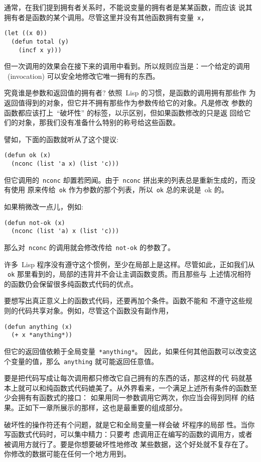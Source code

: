通常，在我们提到拥有者关系时，不能说变量的拥有者是某某函数，而应该
说其拥有者是函数的某个调用。尽管这里并没有其他函数拥有变量~\verb|x|，
\begin{lstlisting}
(let ((x 0))
  (defun total (y)
    (incf x y)))
\end{lstlisting}
但一次调用的效果会在接下来的调用中看到。所以规则应当是：一个给定的调用
~(invocation) 可以安全地修改它唯一拥有的东西。

究竟谁是参数和返回值的拥有者? 依照~Lisp 的习惯，是函数的调用拥有那些作
为返回值得到的对象，但它并不拥有那些作为参数传给它的对象。凡是修改
参数的函数都应该打上~``破坏性'' 的标签，以示区别，但如果函数修改的只是返
回给它们的对象，那我们没有准备什么特别的称号给这些函数。

譬如，下面的函数就听从了这个提议:
\begin{lstlisting}
(defun ok (x)
  (nconc (list 'a x) (list 'c)))
\end{lstlisting}
但它调用的~\texttt{nconc} 却置若罔闻。由于~\texttt{nconc} 拼出来的列表总是重新生成的，而没有使用
原来传给~\texttt{ok} 作为参数的那个列表，所以~\texttt{ok} 总的来说是~ok 的。

如果稍微改一点儿，例如:
\begin{lstlisting}
(defun not-ok (x)
  (nconc (list 'a) x (list 'c)))
\end{lstlisting}
那么对~\texttt{nconc} 的调用就会修改传给~\texttt{not-ok} 的参数了。

许多~Lisp 程序没有遵守这个惯例，至少在局部上是这样。尽管如此，正如我们从
~\verb|ok| 那里看到的，局部的违背并不会让主调函数变质。而且那些与
上述情况相符的函数仍会保留很多纯函数式代码的优点。

要想写出真正意义上的函数式代码，还要再加个条件。函数不能和
不遵守这些规则的代码共享对象。例如，尽管这个函数没有副作用，
\begin{lstlisting}
(defun anything (x)
  (+ x *anything*))
\end{lstlisting}
但它的返回值依赖于全局变量~\texttt{*anything*}。
因此，如果任何其他函数可以改变这个变量的值，那么~\texttt{anything} 就可能返回任意值。

要是把代码写成让每次调用都只修改它自己拥有的东西的话，那这样的代
码就基本上就可以和纯函数式代码媲美了。从外界看来，一个满足上述所有条件的函数至少会拥有有函数式的接口：
如果用同一参数调用它两次，你应当会得到同样
的结果。正如下一章所展示的那样，这也是\bup{}最重要的组成部分。

破坏性的操作符还有个问题，就是它和全局变量一样会破
坏程序的局部
性。当你写函数式代码时，可以集中精力：只要考
虑调用正在编写的函数的调用方，或者被调用方就行了。要是你想要破坏性地修改
某些数据，这个好处就不复存在了。你修改的数据可能在任何一个地方用到。

